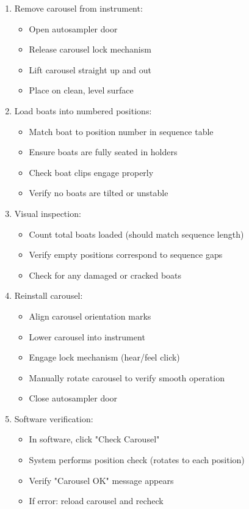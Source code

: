 \documentclass[11pt,a4paper]{article}\usepackage[]{graphicx}\usepackage[]{xcolor}
\begin{document}
\begin{enumerate}[noitemsep]
    \item Remove carousel from instrument:
    \begin{itemize}
        \item Open autosampler door
        \item Release carousel lock mechanism
        \item Lift carousel straight up and out
        \item Place on clean, level surface
    \end{itemize}
    \item Load boats into numbered positions:
    \begin{itemize}
        \item Match boat to position number in sequence table
        \item Ensure boats are fully seated in holders
        \item Check boat clips engage properly
        \item Verify no boats are tilted or unstable
    \end{itemize}
    \item Visual inspection:
    \begin{itemize}
        \item Count total boats loaded (should match sequence length)
        \item Verify empty positions correspond to sequence gaps
        \item Check for any damaged or cracked boats
    \end{itemize}
    \item Reinstall carousel:
    \begin{itemize}
        \item Align carousel orientation marks
        \item Lower carousel into instrument
        \item Engage lock mechanism (hear/feel click)
        \item Manually rotate carousel to verify smooth operation
        \item Close autosampler door
    \end{itemize}
    \item Software verification:
    \begin{itemize}
        \item In software, click "Check Carousel"
        \item System performs position check (rotates to each position)
        \item Verify "Carousel OK" message appears
        \item If error: reload carousel and recheck
    \end{itemize}
\end{enumerate}
\end{document}
